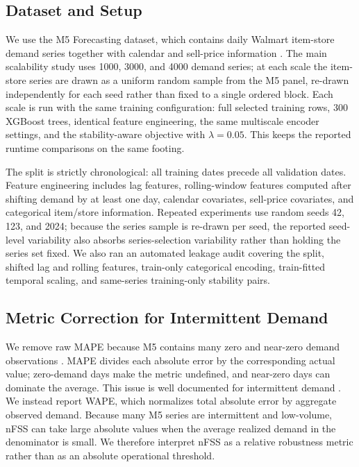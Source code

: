 \documentclass[10pt,conference]{IEEEtran}
\begin{document}
\subsection{Dataset and Setup}
We use the M5 Forecasting dataset, which contains daily Walmart item-store demand series together with calendar and sell-price information \cite{makridakis2022m5}. The main scalability study uses 1000, 3000, and 4000 demand series; at each scale the item-store series are drawn as a uniform random sample from the M5 panel, re-drawn independently for each seed rather than fixed to a single ordered block. Each scale is run with the same training configuration: full selected training rows, 300 XGBoost trees, identical feature engineering, the same multiscale encoder settings, and the stability-aware objective with $\lambda=0.05$. This keeps the reported runtime comparisons on the same footing.

The split is strictly chronological: all training dates precede all validation dates. Feature engineering includes lag features, rolling-window features computed after shifting demand by at least one day, calendar covariates, sell-price covariates, and categorical item/store information. Repeated experiments use random seeds 42, 123, and 2024; because the series sample is re-drawn per seed, the reported seed-level variability also absorbs series-selection variability rather than holding the series set fixed. We also ran an automated leakage audit covering the split, shifted lag and rolling features, train-only categorical encoding, train-fitted temporal scaling, and same-series training-only stability pairs.

\subsection{Metric Correction for Intermittent Demand}
We remove raw MAPE because M5 contains many zero and near-zero demand observations \cite{makridakis2022m5}. MAPE divides each absolute error by the corresponding actual value; zero-demand days make the metric undefined, and near-zero days can dominate the average. This issue is well documented for intermittent demand \cite{hyndman2006accuracyMetrics,syntetos2005accuracy,petropoulos2022forecasting}. We instead report WAPE, which normalizes total absolute error by aggregate observed demand. Because many M5 series are intermittent and low-volume, nFSS can take large absolute values when the average realized demand in the denominator is small. We therefore interpret nFSS as a relative robustness metric rather than as an absolute operational threshold.
\end{document}
